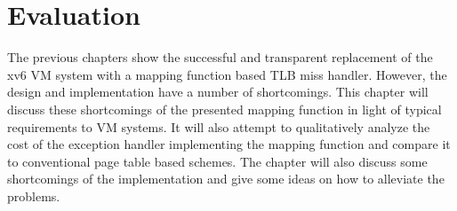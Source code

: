 \chapter{Evaluation}
\label{chap:eval}










The previous chapters show the successful and transparent replacement of the xv6 VM system with a mapping function based TLB miss handler. However, the design and implementation have a number of shortcomings.
This chapter will discuss these shortcomings of the presented mapping function in light of typical requirements to VM systems. It will also attempt to qualitatively analyze the cost of the exception handler implementing the mapping function and compare it to conventional page table based schemes. The chapter will also discuss some shortcomings of the implementation and give some ideas on how to alleviate the problems.

